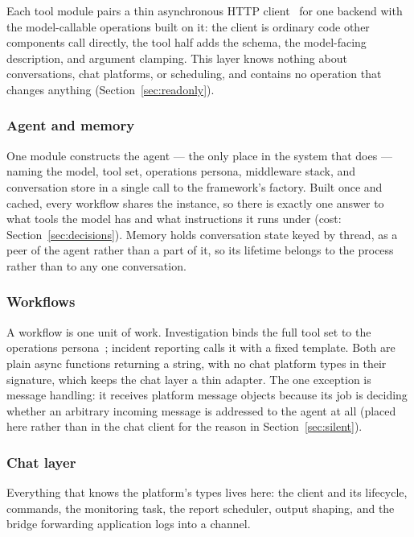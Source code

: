\documentclass[11pt,a4paper]{article}
\begin{document}
Each tool module pairs a thin asynchronous HTTP client~\cite{httpx} for one backend
with the model-callable operations built on it: the client is ordinary code other
components call directly, the tool half adds the schema, the model-facing
description, and argument clamping. This layer knows nothing about conversations,
chat platforms, or scheduling, and contains no operation that changes anything
(Section~\ref{sec:readonly}).

\subsubsection{Agent and memory}

One module constructs the agent --- the only place in the system that does --- naming
the model, tool set, operations persona, middleware stack, and conversation store in
a single call to the framework's factory. Built once and cached, every workflow
shares the instance, so there is exactly one answer to what tools the model has and
what instructions it runs under (cost: Section~\ref{sec:decisions}). Memory holds
conversation state keyed by thread, as a peer of the agent rather than a part of it,
so its lifetime belongs to the process rather than to any one conversation.

\subsubsection{Workflows}

A workflow is one unit of work. Investigation binds the full tool set to the
operations persona~\cite{langchain}; incident reporting calls it with a fixed
template. Both are plain async functions returning a string, with no chat platform
types in their signature, which keeps the chat layer a thin adapter. The one
exception is message handling: it receives platform message objects because its job
is deciding whether an arbitrary incoming message is addressed to the agent at all
(placed here rather than in the chat client for the reason in Section~\ref{sec:silent}).

\subsubsection{Chat layer}

Everything that knows the platform's types lives here: the client and its
lifecycle, commands, the monitoring task, the report scheduler, output shaping, and
the bridge forwarding application logs into a channel.
\end{document}
